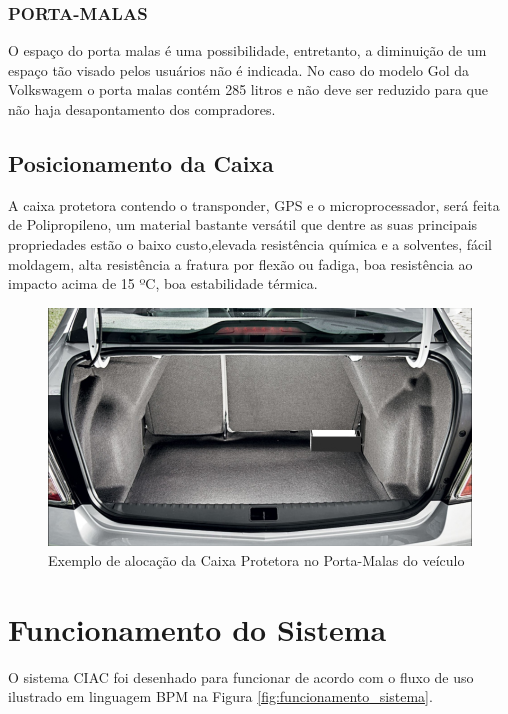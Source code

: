 \subsubsection{PORTA-MALAS}
O espaço do porta malas é uma possibilidade, entretanto, a diminuição de um
espaço tão visado pelos usuários não é indicada. No caso do modelo Gol da
Volkswagem o porta malas contém 285 litros e não deve ser reduzido para que não haja
desapontamento dos compradores.

\subsection{Posicionamento da Caixa}
A caixa protetora contendo o transponder, GPS e o microprocessador, será feita
de Polipropileno, um material bastante versátil que dentre as suas principais
propriedades estão o baixo custo,elevada resistência química e a solventes,
fácil moldagem, alta resistência a fratura por flexão ou fadiga, boa resistência
ao impacto acima de 15 ºC, boa estabilidade térmica.


\begin{figure}[h]
  \centering
  \includegraphics[width=470px, scale=1]{figuras/posicionamento_caixa}
  \caption{Exemplo de alocação da Caixa Protetora no Porta-Malas do veículo}
\label{fig:posicionamento_caixa}
\end{figure}



\section{Funcionamento do Sistema}

O sistema CIAC foi desenhado para funcionar de acordo com o fluxo de uso ilustrado
em linguagem BPM na Figura \ref{fig:funcionamento_sistema}.

